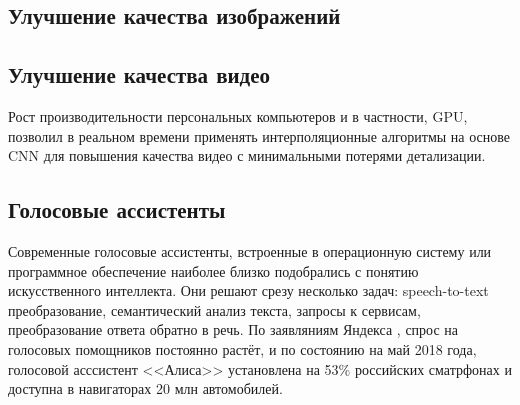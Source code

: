 \documentclass{article}
\begin{document}
    \subsection*{Улучшение качества изображений}
    
    
    \subsection*{Улучшение качества видео}
        Рост производительности персональных компьютеров и в частности, GPU, позволил \citep{shi2016real} в реальном времени применять интерполяционные алгоритмы на основе CNN для повышения качества видео с минимальными потерями детализации. 
        
    \subsection*{Голосовые ассистенты \citep{10.1007/978-3-319-60366-7_23}}
        Современные голосовые ассистенты, встроенные в операционную систему или программное обеспечение наиболее близко подобрались с понятию искусственного интеллекта. Они решают срезу несколько задач: speech-to-text преобразование, семантический анализ текста, запросы к сервисам, преобразование ответа обратно в речь. По заявляниям Яндекса \citep{yandex2018conf}, спрос на голосовых помощников постоянно растёт, и по состоянию на май 2018 года, голосовой асссистент <<Алиса>> установлена на 53\% российских сматрфонах и доступна в навигаторах 20 млн автомобилей.



\end{document}
